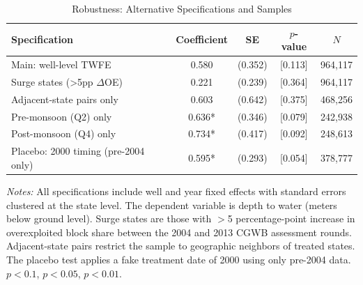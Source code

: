 \begin{table}[htbp]
\centering
\caption{Robustness: Alternative Specifications and Samples}
\label{tab:robustness}
\begin{threeparttable}
\begin{tabular}{lcccc}
\toprule
Specification & Coefficient & SE & $p$-value & $N$ \\
\midrule
Main: well-level TWFE & 0.580 & (0.352) & [0.113] & 964,117 \\
Surge states (>5pp $\Delta$OE) & 0.221 & (0.239) & [0.364] & 964,117 \\
Adjacent-state pairs only & 0.603 & (0.642) & [0.375] & 468,256 \\
Pre-monsoon (Q2) only & 0.636* & (0.346) & [0.079] & 242,938 \\
Post-monsoon (Q4) only & 0.734* & (0.417) & [0.092] & 248,613 \\
Placebo: 2000 timing (pre-2004 only) & 0.595* & (0.293) & [0.054] & 378,777 \\
\bottomrule
\end{tabular}
\begin{tablenotes}[flushleft]
\small
\item \textit{Notes:} All specifications include well and year fixed effects
with standard errors clustered at the state level. The dependent variable is
depth to water (meters below ground level). Surge states are those with
$>$5 percentage-point increase in overexploited block share between the 2004
and 2013 CGWB assessment rounds. Adjacent-state pairs restrict the sample to
geographic neighbors of treated states. The placebo test applies a fake
treatment date of 2000 using only pre-2004 data.
\sym{*} $p<0.1$, \sym{**} $p<0.05$, \sym{***} $p<0.01$.
\end{tablenotes}
\end{threeparttable}
\end{table}
